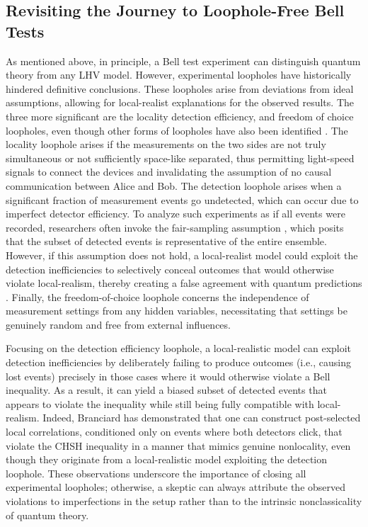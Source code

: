 \documentclass[aps,pra,reprint, superscriptaddress,showkeys]{revtex4-2}
\theoremstyle{plain}
\begin{document}
\subsection{Revisiting the Journey to Loophole-Free Bell Tests}
\label{historic}

As mentioned above, in principle, a Bell test experiment can distinguish quantum theory from any LHV model. However, experimental loopholes \cite{larsson2014} have historically hindered definitive conclusions. These loopholes arise from deviations from ideal assumptions, allowing for local-realist explanations for the observed results. The three more significant are the locality detection efficiency, and freedom of choice loopholes, even though other forms of loopholes have also been identified \cite{barrett2002quantum,bendersky2016algorithmic}. The locality loophole arises if the measurements on the two sides are not truly simultaneous or not sufficiently space-like separated, thus permitting light-speed signals to connect the devices and invalidating the assumption of no causal communication between Alice and Bob. The detection loophole arises when a significant fraction of measurement events go undetected, which can occur due to imperfect detector efficiency. To analyze such experiments as if all events were recorded, researchers often invoke the fair-sampling assumption \cite{berry2010fair}, which posits that the subset of detected events is representative of the entire ensemble. However, if this assumption does not hold, a local-realist model could exploit the detection inefficiencies to selectively conceal outcomes that would otherwise violate local-realism, thereby creating a false agreement with quantum predictions \cite{Branciard2011}. Finally, the freedom-of-choice loophole concerns the independence of measurement settings from any hidden variables, necessitating that settings be genuinely random and free from external influences.


Focusing on the detection efficiency loophole, a local-realistic model can exploit detection inefficiencies by deliberately failing to produce outcomes (i.e., causing lost events) precisely in those cases where it would otherwise violate a Bell inequality. As a result, it can yield a biased subset of detected events that appears to violate the inequality while still being fully compatible with local-realism. Indeed, Branciard \cite{Branciard2011} has demonstrated that one can construct post-selected local correlations, conditioned only on events where both detectors click, that violate the CHSH inequality in a manner that mimics genuine nonlocality, even though they originate from a local-realistic model exploiting the detection loophole. These observations underscore the importance of closing all experimental loopholes; otherwise, a skeptic can always attribute the observed violations to imperfections in the setup rather than to the intrinsic nonclassicality of quantum theory.
\end{document}
